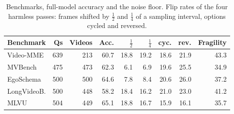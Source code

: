 \begin{table}[t]
\centering
\caption{Benchmarks, full-model accuracy and the noise floor. Flip rates of the four harmless passes: frames shifted by $\frac12$ and $\frac14$ of a sampling interval, options cycled and reversed.}
\label{tab:bench}
\footnotesize
\setlength{\tabcolsep}{2.6pt}
\begin{tabular}{lrrrrrrrr}
\toprule
Benchmark & Qs & Videos & Acc. & $\frac12$ & $\frac14$ & cyc. & rev. & Fragility \\
\midrule
Video-MME & 639 & 213 & 60.7 & 18.8 & 19.2 & 18.6 & 21.9 & 43.3 \\
MVBench & 475 & 473 & 62.3 & 6.1 & 6.9 & 19.6 & 25.5 & 34.9 \\
EgoSchema & 500 & 500 & 64.6 & 7.8 & 8.4 & 20.6 & 26.0 & 37.2 \\
LongVideoB. & 500 & 448 & 58.2 & 18.4 & 16.2 & 21.0 & 23.0 & 41.2 \\
MLVU & 504 & 449 & 65.1 & 18.8 & 16.7 & 15.9 & 16.1 & 35.7 \\
\bottomrule
\end{tabular}
\end{table}